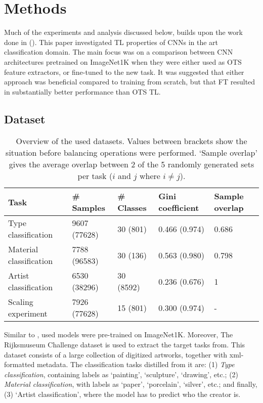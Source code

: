 \section{Methods}

Much of the experiments and analysis discussed below, builds upon the work done in \citeauthor{sabatelli2018deep} (\citeyear{sabatelli2018deep}). This paper investigated TL properties of CNNs in the art classification domain. The main focus was on a comparison between CNN architectures pretrained on ImageNet1K when they were either used as OTS feature extractors, or fine-tuned to the new task. It was suggested that either approach was beneficial compared to training from scratch, but that FT resulted in substantially better performance than OTS TL.

\subsection{Dataset}

\begin{table*}[tb]
\centering
\small
\begin{tabular}{lllll}
\hline
\textbf{Task} & \textbf{\# Samples} & \textbf{\# Classes} & \textbf{Gini coefficient} & \textbf{Sample overlap} \\ \hline
Type classification & 9607 (77628) & 30 (801) & 0.466 (0.974) & 0.686 \\
Material classification & 7788 (96583) & 30 (136) & 0.563 (0.980) & 0.798 \\
Artist classification & 6530 (38296) & 30 (8592) & 0.236 (0.676) & 1 \\
Scaling experiment & 7926 (77628) & 15 (801) & 0.300 (0.974) & - \\ \hline
\end{tabular}
\caption{Overview of the used datasets. Values between brackets show the situation before balancing operations were performed. `Sample overlap' gives the average overlap between 2 of the 5 randomly generated sets per task ($i$ and $j$ where $i \neq j$).}
\label{methods:datasets}
\end{table*}

Similar to \citeauthor{sabatelli2018deep}, used models were pre-trained on ImageNet1K. Moreover, The Rijksmuseum Challenge dataset \citep{mensink14icmr} is used to extract the target tasks from. This dataset consists of a large collection of digitized artworks, together with xml-formatted metadata. The classification tasks distilled from it are: (1) \textit{Type classification}, containing labels as `painting', `sculpture', `drawing', etc.; (2) \textit{Material classification}, with labels as `paper', `porcelain', `silver', etc.; and finally, (3) `Artist classification', where the model has to predict who the creator is.

